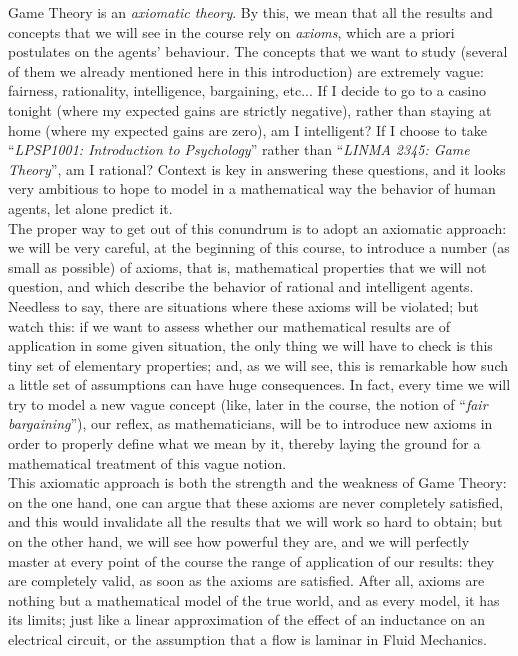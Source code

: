 Game Theory is an \emph{axiomatic theory}.  By this, we mean that all the results and concepts that we will see in the course rely on \emph{axioms}, which are a priori postulates on the agents' behaviour.  The concepts that we want to study (several of them we already mentioned here in this introduction) are extremely vague: fairness, rationality, intelligence, bargaining, etc...  If I decide to go to a casino tonight (where my expected gains are strictly negative), rather than staying at home (where my expected gains are zero), am I intelligent?  If I choose to take ``\emph{LPSP1001: Introduction to Psychology}'' rather than ``\emph{LINMA 2345: Game Theory}'', am I rational?  Context is key in answering these questions, and it looks very ambitious to hope to model in a mathematical way the behavior of human agents, let alone predict it.  \\
The proper way to get out of this conundrum is to adopt an axiomatic approach: we will be very careful, at the beginning of this course, to introduce a number (as small as possible) of axioms, that is, mathematical properties that we will not question, and which describe the behavior of rational and intelligent agents.  Needless to say, there are situations where these axioms will be violated; but watch this: if we want to assess whether our mathematical results are of application in some given situation, the only thing we will have to check is this tiny set of elementary properties; and, as we will see, this is remarkable how such a little set of assumptions can have huge consequences.  In fact, every time we will try to model a new vague concept (like, later in the course, the notion of ``\emph{fair bargaining}''), our reflex, as mathematicians, will be to introduce new axioms in order to properly define what we mean by it, thereby laying the ground for a mathematical treatment of this vague notion. \\This axiomatic approach is both the strength and the weakness of Game Theory: on the one hand, one can argue that these axioms are never completely satisfied, and this would invalidate all the results that we will work so hard to obtain; but on the other hand, we will see how powerful they are, and we will perfectly master at every point of the course the range of application of our results: they are completely valid, as soon as the axioms are satisfied.  After all, axioms are nothing but a mathematical model of the true world, and as every model, it has its limits; just like a linear approximation of the effect of an inductance on an electrical circuit, or the assumption that a flow is laminar in Fluid Mechanics.



